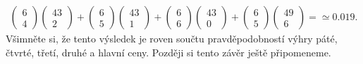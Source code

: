 \begin{example}
\begin{itemize}
\begin{align*}
{                          \begin{pmatrix}  6 \\ 4\end{pmatrix}
                          \begin{pmatrix} 43 \\ 2\end{pmatrix}  +
                          \begin{pmatrix}  6 \\ 5\end{pmatrix}
                          \begin{pmatrix} 43 \\ 1\end{pmatrix}  +
                          \begin{pmatrix}  6 \\ 6\end{pmatrix}
                          \begin{pmatrix} 43 \\ 0\end{pmatrix}  +
                          \begin{pmatrix}  6 \\ 5\end{pmatrix}}
                         {\begin{pmatrix} 49 \\ 6\end{pmatrix}} =\simeq\num{0.019}.
          \end{align*}
          Všimněte si, že tento výsledek je roven součtu pravděpodobností výhry páté, čtvrté, 
          třetí, druhé a hlavní ceny. Později si tento závěr ještě připomeneme.
  \end{itemize}  
  \normalsize
\end{example}
